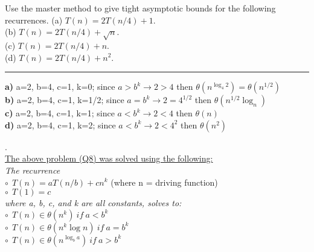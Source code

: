 \documentclass[letterpaper,12pt]{article}
\begin{document}
\begin{enumerate}
Use the master method to give tight asymptotic bounds for the following 
recurrences.
(a) $T(n)=2T(n/4)+1$. \\ (b) $T(n)=2T(n/4)+\sqrt{n}$. \\
(c) $T(n)=2T(n/4)+n$. \\ (d) $T(n)=2T(n/4)+n^2$. \\
\noindent\rule{16cm}{0.1pt}
\textbf{a)} a=2, b=4, c=1, k=0; since \( a > b^k \rightarrow 2 > 4\) then \(\theta(n^{\log_{4}2}) = \theta(n^{1/2})\)
\\
\textbf{b)} a=2, b=4, c=1, k=1/2; since \( a = b^k \rightarrow 2 = 4^{1/2}\) then \(\theta(n^{1/2}\log_{n})\)
\\
\textbf{c)} a=2, b=4, c=1, k=1; since \( a < b^k \rightarrow 2 < 4\) then \(\theta(n)\)
\\
\textbf{d)} a=2, b=4, c=1, k=2; since \( a < b^k \rightarrow 2 < 4^2\) then \(\theta(n^2)\)

. \\

\underline{The above problem (Q8) was solved using the following:} \\
\textit{The recurrence} \\
\( \circ \ \ T(n) = aT(n/b) + cn^{k}\) (where n = driving function)\\
\( \circ \ \ T(1) = c\) \\ 
\textit{where a, b, c, and k are all constants, solves to:} \\
\( \circ \ \  T(n) \in \theta(n^k) \ if \ a < b^k\) \\
\( \circ \ \  T(n) \in \theta(n^{k}\log n) \ if \ a = b^k\) \\
\( \circ \ \  T(n) \in \theta(n^{\log_{b}a}) \ if \ a > b^k\) \\



\end{enumerate}
\end{document}
